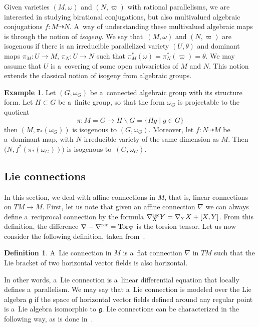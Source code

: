 \documentclass[pdftex]{sigma}
\numberwithin{equation}{section}
\theoremstyle{definition}
\newtheorem{Definition}[Theorem]{Definition}
\newtheorem{Example}[Theorem]{Example}
\begin{document}
Given varieties $(M,\omega)$ and $(N,\varpi)$ with rational parallelisms, we are interested in studying birational conjugations, but also multivalued algebraic conjugations $f\colon M\dasharrow N$. A~way of understanding these multivalued algebraic maps is through the notion of \emph{isogeny}. We say that~$(M,\omega)$ and $(N,\varpi)$ are isogenous if there is an irreducible parallelized variety $(U,\theta)$ and dominant maps $\pi_M \colon U\to M$, $\pi_N\colon U \to N$ such that $\pi_M^*(\omega) = \pi_N^*(\varpi) = \theta$. We may assume that $U$ is a~covering of some open subvarieties of $M$ and $N$. This notion extends the classical notion of isogeny from algebraic groups.

\begin{Example}
 Let $(G,\omega_G)$ be a~connected algebraic group with its structure form. Let $H\subset G$ be a~finite group, so that the form $\omega_G$ is projectable to the quotient
 \[\pi\colon M = G\to H\backslash G = \{Hg \mid g\in G\}\]
 then $(M, \pi_*(\omega_G))$ is isogenous to $(G,\omega_G)$. Moreover, let $f\colon N\dasharrow M$ be a~dominant map, with $N$ irreducible variety of the same dimension as $M$. Then $\bigl(N,f^*(\pi_*(\omega_G))\bigr)$
 is isogenous to~$(G,\omega_G)$.
\end{Example}

\subsection{Lie connections}

In this section, we deal with affine connections in $M$, that is, linear connections on $TM\to M$. First, let us note that given an affine connection $\nabla$ we can always define a~reciprocal connection by the formula
$\nabla^{\rm rec}_X Y = \nabla_Y X + [X,Y]$.
From this definition, the difference $\nabla - \nabla^{\rm rec}= {\rm Tor}_\nabla$ is the torsion tensor. Let us now consider the following definition, taken from~\cite{bc2017}.

\begin{Definition} A~Lie connection in $M$ is a~flat connection $\nabla$ in $TM$ such that the Lie bracket of two horizontal vector fields is also horizontal.
\end{Definition}

In other words, a~Lie connection is a~linear differential equation that locally defines a~parallelism. We may say that a~Lie connection is modeled over the Lie algebra $\mathfrak g$ if the space of horizontal vector fields defined around any regular point is a~Lie algebra isomorphic to $\mathfrak g$. Lie connections can be characterized in the following way, as is done in~\cite[Proposition 3.10]{bc2017}.
\end{document}
